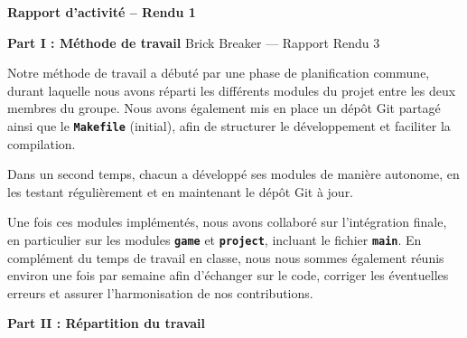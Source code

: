 \documentclass[10pt,a4paper]{article}
\begin{document}
\begin{center}
    {\huge \textbf{Rapport d'activit\'e -- Rendu 1}}
\end{center}
\vspace{0.5cm}
{\large \textbf{Part I : Méthode de travail}}
Brick Breaker — Rapport Rendu 3
\begin{list}{}{\leftmargin=0.5cm \rightmargin=0cm}
\item
Notre méthode de travail a débuté par une phase de planification
commune, durant laquelle nous avons réparti les différents modules
du projet entre les deux membres du groupe. Nous avons également mis
en place un dépôt Git partagé ainsi que le \textbf{\texttt{Makefile}} (initial), afin
de structurer le développement et faciliter la compilation.

Dans un second temps, chacun a développé ses modules de manière
autonome, en les testant régulièrement et en maintenant le dépôt Git
à jour.

Une fois ces modules implémentés, nous avons collaboré sur
l’intégration finale, en particulier sur les modules \textbf{\texttt{game}}
et \textbf{\texttt{project}}, incluant le fichier \textbf{\texttt{main}}. En complément
du temps de travail en classe, nous nous sommes également réunis
environ une fois par semaine afin d’échanger sur le code, corriger
les éventuelles erreurs et assurer l’harmonisation de nos
contributions.


\end{list}

{\large \textbf{Part II : Répartition du travail}}
\end{document}
